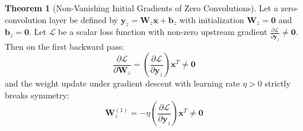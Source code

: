 \documentclass[11pt,a4paper]{article}
\theoremstyle{definition}
\newtheorem{theorem}{\textbf{Theorem}}[section]
\begin{document}
\begin{theorem}[Non-Vanishing Initial Gradients of Zero Convolutions]
Let a zero-convolution layer be defined by $\mathbf{y}_z = \mathbf{W}_z \mathbf{x} + \mathbf{b}_z$ with initialization $\mathbf{W}_z = \mathbf{0}$ and $\mathbf{b}_z = \mathbf{0}$. Let $\mathcal{L}$ be a scalar loss function with non-zero upstream gradient $\frac{\partial \mathcal{L}}{\partial \mathbf{y}_z} \ne \mathbf{0}$. Then on the first backward pass:
{\boldmath
\begin{equation}
\frac{\partial \mathcal{L}}{\partial \mathbf{W}_z} = \left( \frac{\partial \mathcal{L}}{\partial \mathbf{y}_z} \right) \mathbf{x}^T \ne \mathbf{0}
\end{equation}
}
and the weight update under gradient descent with learning rate $\eta > 0$ strictly breaks symmetry:
{\boldmath
\begin{equation}
\mathbf{W}_z^{(1)} = -\eta \left( \frac{\partial \mathcal{L}}{\partial \mathbf{y}_z} \right) \mathbf{x}^T \ne \mathbf{0}
\end{equation}
}
\end{theorem}
\end{document}
